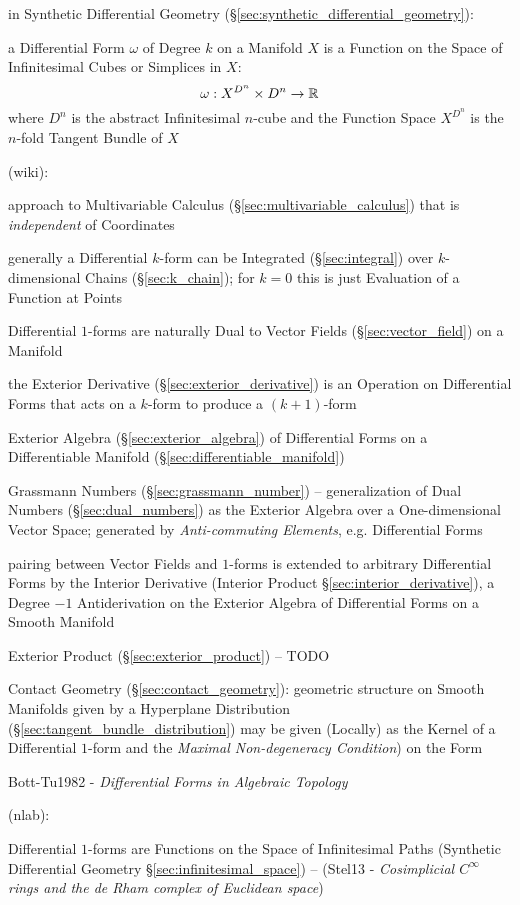 in Synthetic Differential Geometry
(\S\ref{sec:synthetic_differential_geometry}):

a Differential Form $\omega$ of Degree $k$ on a Manifold $X$ is a Function on
the Space of Infinitesimal Cubes or Simplices in $X$:
\[
  \omega : X^{D^n} \times D^n \rightarrow \mathbb{R}
\]
where $D^n$ is the abstract Infinitesimal $n$-cube and the Function Space
$X^{D^n}$ is the $n$-fold Tangent Bundle of $X$

(wiki):

approach to Multivariable Calculus (\S\ref{sec:multivariable_calculus})
that is \emph{independent} of Coordinates

generally a Differential $k$-form can be Integrated
(\S\ref{sec:integral}) over $k$-dimensional Chains (\S\ref{sec:k_chain}); for
$k=0$ this is just Evaluation of a Function at Points

Differential $1$-forms are naturally Dual to Vector Fields
(\S\ref{sec:vector_field}) on a Manifold

the Exterior Derivative (\S\ref{sec:exterior_derivative}) is an Operation on
Differential Forms that acts on a $k$-form to produce a $(k+1)$-form

Exterior Algebra (\S\ref{sec:exterior_algebra}) of Differential Forms on a
Differentiable Manifold (\S\ref{sec:differentiable_manifold})

\fist Grassmann Numbers (\S\ref{sec:grassmann_number}) -- generalization of Dual
Numbers (\S\ref{sec:dual_numbers}) as the Exterior Algebra over a
One-dimensional Vector Space; generated by \emph{Anti-commuting Elements}, e.g.
Differential Forms

pairing between Vector Fields and $1$-forms is extended to arbitrary
Differential Forms by the Interior Derivative (Interior Product
\S\ref{sec:interior_derivative}), a Degree $-1$ Antiderivation on the Exterior
Algebra of Differential Forms on a Smooth Manifold

Exterior Product (\S\ref{sec:exterior_product}) -- TODO

\fist Contact Geometry (\S\ref{sec:contact_geometry}): geometric structure on
Smooth Manifolds given by a Hyperplane Distribution
(\S\ref{sec:tangent_bundle_distribution}) may be given (Locally) as the Kernel
of a Differential $1$-form and the \emph{Maximal Non-degeneracy Condition}) on
the Form

Bott-Tu1982 - \emph{Differential Forms in Algebraic Topology}

(nlab):

Differential $1$-forms are Functions on the Space of Infinitesimal Paths
(Synthetic Differential Geometry \S\ref{sec:infinitesimal_space}) -- (Stel13 -
\emph{Cosimplicial $C^\infty$ rings and the de Rham complex of Euclidean space})

